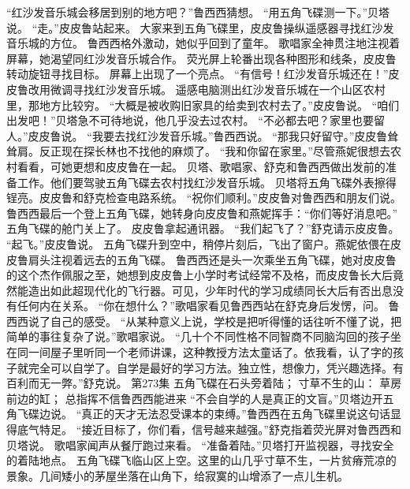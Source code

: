 \documentclass[a4paper,12pt,UTF8,twoside]{ctexbook}
\begin{document}
        “红沙发音乐城会移居到别的地方吧？”鲁西西猜想。  
        “用五角飞碟测一下。”贝塔说。  
        “走。”皮皮鲁站起来。  
        大家来到五角飞碟里，皮皮鲁操纵遥感器寻找红沙发音乐城的方位。  
        鲁西西格外激动，她似乎回到了童年。  
        歌唱家全神贯注地注视着屏幕，她渴望同红沙发音乐城合作。        
        荧光屏上轮番出现各种图形和线条，皮皮鲁转动旋钮寻找目标。  
        屏幕上出现了一个亮点。  
        “有信号！红沙发音乐城还在！”皮皮鲁改用微调寻找红沙发音乐城。  
        遥感电脑测出红沙发音乐城在一个山区农村里，那地方比较穷。  
        “大概是被收购旧家具的给卖到农村去了。”皮皮鲁说。  
        “咱们出发吧！”贝塔急不可待地说，他几乎没去过农村。  
        “不必都去吧？家里也要留人。”皮皮鲁说。  
        “我要去找红沙发音乐城。”鲁西西说。  
        “那我只好留守。”皮皮鲁耸耸肩。反正现在探长林也不找他的麻烦了。  
        “我和你留在家里。”尽管燕妮很想去农村看看，可她更想和皮皮鲁在一起。  
        贝塔、歌唱家、舒克和鲁西西做出发前的准备工作。他们要驾驶五角飞碟去农村找红沙发音乐城。  
        贝塔将五角飞碟外表擦得锃亮。皮皮鲁和舒克检查电路系统。  
        “祝你们顺利。”皮皮鲁对鲁西西和朋友们说。  
        鲁西西最后一个登上五角飞碟，她转身向皮皮鲁和燕妮挥手：“你们等好消息吧。”        
        五角飞碟的舱门关上了。  
        皮皮鲁拿起通讯器。  
        “我们起飞了？”舒克请示皮皮鲁。  
        “起飞。”皮皮鲁说。  
        五角飞碟升到空中，稍停片刻后，飞出了窗户。燕妮依偎在皮皮鲁肩头注视着远去的五角飞碟。  
        鲁西西还是头一次乘坐五角飞碟，她对皮皮鲁的这个杰作佩服之至，她想到皮皮鲁上小学时考试经常不及格，而皮皮鲁长大后竟然能造出如此超现代化的飞行器。可见，少年时代的学习成绩同长大后有否出息没有任何内在关系。  
        “你在想什么？”歌唱家看见鲁西西站在舒克身后发愣，问。  
        鲁西西说了自己的感受。  
        “从某种意义上说，学校是把听得懂的话往听不懂了说，把简单的事往复杂了说。”歌唱家说。  
        “几十个不同性格不同智商不同脑沟回的孩子坐在同一间屋子里听同一个老师讲课，这种教授方法太童话了。依我看，认了字的孩子就完全可以自学了。自学是最好的学习方法。独立性，想像力，凭兴趣选择。有百利而无一弊。”舒克说。          第273集  
        五角飞碟在石头旁着陆；  
        寸草不生的山：  
        草房前边的缸；  
        总指挥不信鲁西西能进来    
        “不会自学的人是真正的文盲。”贝塔边开五角飞碟边说。  
        “真正的天才无法忍受课本的束缚。”鲁西西在五角飞碟里说这句话显得底气特足。  
        “接近目标了，你们看，信号越来越强。”舒克指着荧光屏对鲁西西和贝塔说。  
        歌唱家闻声从餐厅跑过来看。  
        “准备着陆。”贝塔打开监视器，寻找安全的着陆地点。  
        五角飞碟飞临山区上空。这里的山几乎寸草不生，一片贫瘠荒凉的景象。几间矮小的茅屋坐落在山角下，给寂寞的山增添了一点儿生机。  
\end{document}
